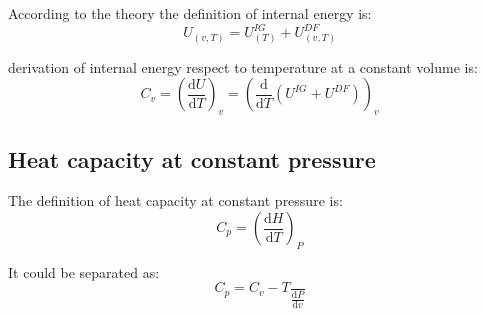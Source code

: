 \documentclass{article}
\begin{document}
According to the theory the definition of internal energy is:
\begin{equation}
    U_{(v,T)} = U^{IG}_{(T)} + U^{DF}_{(v,T)}    
\end{equation}

derivation of internal energy respect to temperature at a constant volume is:
\begin{equation*}
    C_v = \left(\frac{\mathrm{d}U}{\mathrm{d}T}\right)_v = \left(\frac{\mathrm{d}}{\mathrm{d}T}\left(U^{IG} + U^{DF}\right)\right)_v 
\end{equation*}

\subsection{Heat capacity at constant pressure}
The definition of heat capacity at constant pressure is:
\begin{equation}
    C_p = \left(\frac{\mathrm{d}H}{\mathrm{d}T}\right)_P
\end{equation}

It could be separated as:
\begin{equation*}
    C_p = C_v - T\frac{}{\frac{\mathrm{d}P}{\mathrm{d}v}}
\end{equation*}
\end{document}
